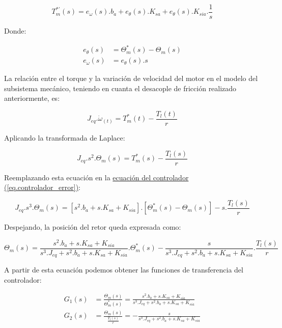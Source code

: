 \documentclass{article}
\begin{document}
\begin{equation}\label{eq.controlador_error}
    T_m^{*\prime}(s) = e_\omega(s).b_a + e_\theta(s).K_{sa} + e_\theta(s).K_{sia}.\frac{1}{s}
\end{equation}

Donde:

\begin{align*}
    e_\theta(s) &= \Theta_m^*(s) - \Theta_m(s) \\
    e_\omega(s) &= e_\theta(s).s
\end{align*}

La relación entre el torque y la variación de velocidad del motor en el modelo del subsistema mecánico, 
teniendo en cuanta el desacople de fricción realizado anteriormente, es:

\begin{equation}
    J_{eq}.\dot{\omega}_(t) = T_m^*(t) - \frac{T_l(t)}{r}
\end{equation}

Aplicando la transformada de Laplace:

\begin{equation}
    J_{eq}.s^2.\Theta_m(s) = T_m^*(s) - \frac{T_l(s)}{r}
\end{equation}

Reemplazando esta ecuación en la
\hyperref[eq.controlador_error]{ecuación del controlador (\ref*{eq.controlador_error})}:

\begin{equation}
    J_{eq}.s^3.\Theta_m(s) = [s^2.b_a + s.K_{sa} + K_{sia}].[\Theta_m^*(s) - \Theta_m(s)] - s.\frac{T_l(s)}{r}
\end{equation}

Despejando, la posición del retor queda expresada como:

\begin{equation}
    \Theta_m(s) = \frac{s^2.b_a + s.K_{sa} + K_{sia}}{s^3.J_{eq} + s^2.b_a + s.K_{sa} + K_{sia}}.\Theta_m^*(s) - \frac{s}{s^3.J_{eq} + s^2.b_a + s.K_{sa} + K_{sia}}.\frac{T_l(s)}{r}
\end{equation}

A partir de esta ecuación podemos obtener las funciones de transferencia del controlador:

\begin{align}
    G_1(s) &= \frac{\Theta_m(s)}{\Theta_m^*(s)} = \frac{s^2.b_a + s.K_{sa} + K_{sia}}{s^3.J_{eq} + s^2.b_a + s.K_{sa} + K_{sia}} \\
    G_2(s) &= \frac{\Theta_m(s)}{\frac{T_l(s)}{r}} = -\frac{s}{s^3.J_{eq} + s^2.b_a + s.K_{sa} + K_{sia}}
\end{align}
\end{document}
